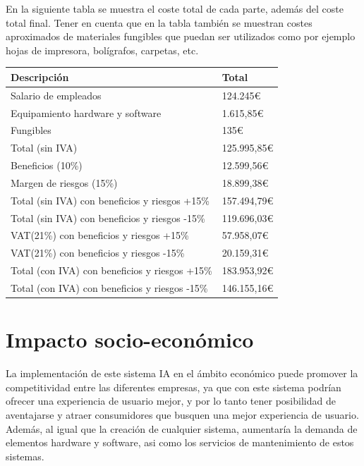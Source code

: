 \documentclass[12pt]{report} %
\begin{document}
En la siguiente tabla se muestra el coste total de cada parte, además del coste total final. Tener en cuenta que en la tabla también se muestran costes aproximados de materiales fungibles que puedan ser utilizados como por ejemplo hojas de impresora, bolígrafos, carpetas, etc.

\begin{table}[H]
	{
	  \begin{tabular}{|P{9cm}|P{4cm}|}
		\hline
		{\textbf{Descripción}} & {\textbf{Total}} \\
		\hline
		Salario de empleados & 124.245€ \\
		\hline
		Equipamiento hardware y software & 1.615,85€ \\
		\hline
		Fungibles & 135€ \\
		\hline
		Total (sin IVA) & 125.995,85€ \\
		\hline
		Beneficios (10\%) & 12.599,56€ \\
		\hline
		Margen de riesgos (15\%) & 18.899,38€ \\
		\hline
		Total (sin IVA) con beneficios y riesgos +15\% & 157.494,79€ \\
		\hline
		Total (sin IVA) con beneficios y riesgos -15\% & 119.696,03€ \\
		\hline
		VAT(21\%) con beneficios y riesgos +15\% & 57.958,07€ \\
		\hline
		VAT(21\%) con beneficios y riesgos -15\% & 20.159,31€ \\
		\hline
		Total (con IVA) con beneficios y riesgos +15\% & 183.953,92€ \\
		\hline
		Total (con IVA) con beneficios y riesgos -15\% & 146.155,16€ \\
		\hline
	  \end{tabular}
	}
\end{table}

\section{Impacto socio-económico}

La implementación de este sistema IA en el ámbito económico puede promover la competitividad entre las diferentes empresas, ya que con este sistema podrían ofrecer una experiencia de usuario mejor, y por lo tanto tener posibilidad de aventajarse y atraer consumidores que busquen una mejor experiencia de usuario. Además, al igual que la creación de cualquier sistema, aumentaría la demanda de elementos hardware y software, asi como los servicios de mantenimiento de estos sistemas.
\end{document}
